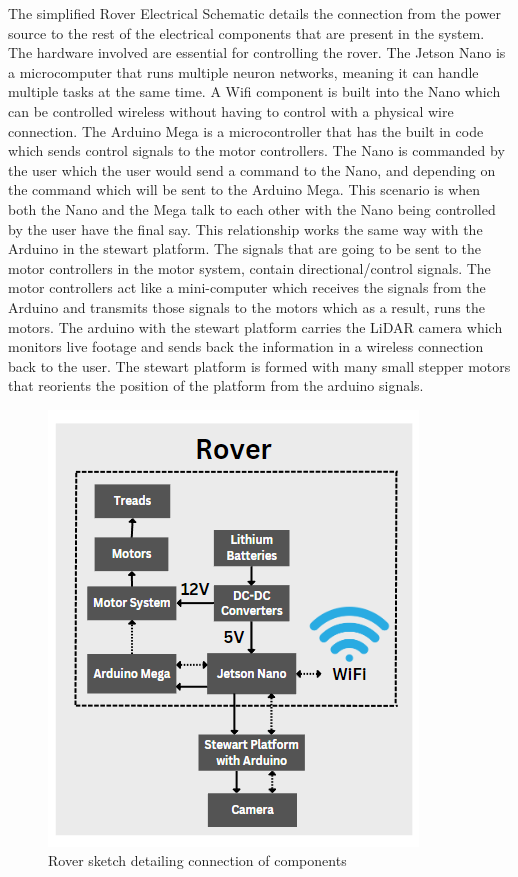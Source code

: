\documentclass[a4paper, 10pt]{article}
\begin{document}
		
		The simplified Rover Electrical Schematic details the connection from the power source to the rest of the electrical components that are present in the system. The hardware involved are essential for controlling the rover. The Jetson Nano is a microcomputer that runs multiple neuron networks, meaning it can handle multiple tasks at the same time. A Wifi component is built into the Nano which can be controlled wireless without having to control with a physical wire connection. The Arduino Mega is a microcontroller that has the built in code which sends control signals to the motor controllers. The Nano is commanded by the user which the user would send a command to the Nano, and depending on the command which will be sent to the Arduino Mega. This scenario is when both the Nano and the Mega talk to each other with the Nano being controlled by the user have the final say. This relationship works the same way with the Arduino in the stewart platform. The signals that are going to be sent to the motor controllers in the motor system, contain directional/control signals. The motor controllers act like a mini-computer which receives the signals from the Arduino and transmits those signals to the motors which as a result, runs the motors. The arduino with the stewart platform carries the LiDAR camera which monitors live footage and sends back the information in a wireless connection back to the user. The stewart platform is formed with many small stepper motors that reorients the position of the platform from the arduino signals.  
		
		\begin{figure} [!h]
			\centering
			\includegraphics[scale= 0.9]{Photos/Rover schematic simplified}
			\caption{Rover sketch detailing connection of components}
			\label{rover_schema}
		\end{figure}
\end{document}
